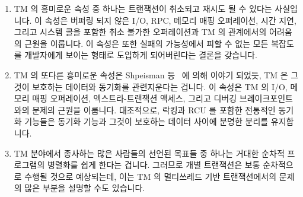 \begin{enumerate}
\item	TM 의 흥미로운 속성 중 하나는 트랜잭션이 취소되고 재시도 될 수 있다는
	사실입니다.
	이 속성은 버퍼링 되지 않은 I/O, RPC, 메모리 매핑 오퍼레이션, 시간 지연,
	그리고  시스템 콜을 포함한 취소 불가한 오퍼레이션과 TM 의
	관계에서의 어려움의 근원을 이룹니다.
	이 속성은 또한 실패의 가능성에서 피할 수 없는 모든 복잡도를 개발자에게
	보이는 형태로 도입하게 되어버린다는 결론을 갖습니다.
\item	TM 의 또다른 흥미로운 속성은
	Shpeisman 등~\cite{TatianaShpeisman2009CppTM} 에 의해 이야기 되었듯, TM
	은 그것이 보호하는 데이터와 동기화를 관련지운다는 겁니다.
	이 속성은 TM 의 I/O, 메모리 매핑 오퍼레이션, 엑스트라-트랜잭션 액세스,
	그리고 디버깅 브레이크포인트와의 문제의 근원을 이룹니다.
	대조적으로, 락킹과 RCU 를 포함한 전통적인 동기화 기능들은 동기화 기능과
	그것이 보호하는 데이터 사이에 분명한 분리를 유지합니다.
\item	TM 분야에서 종사하는 많은 사람들의 선언된 목표들 중 하나는 거대한
	순차적 프로그램의 병렬화를 쉽게 한다는 겁니다.
	그러므로 개별 트랜잭션은 보통 순차적으로 수행될 것으로 예상되는데, 이는
	TM 의 멀티쓰레드 기반 트랜잭션에서의 문제의 많은 부분을 설명할 수도
	있습니다.

\end{enumerate}

